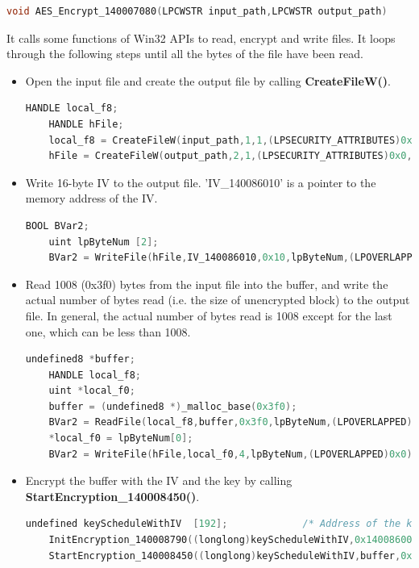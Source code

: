 \documentclass[11pt]{article}
\begin{document}
\begin{lstlisting}[language=c++]
void AES_Encrypt_140007080(LPCWSTR input_path,LPCWSTR output_path)
\end{lstlisting}

It calls some functions of Win32 APIs to read, encrypt and write files. It loops through the following steps until all the bytes of the file have been read.

\begin{itemize}
  \item Open the input file and create the output file by calling \textbf{CreateFileW()}.
  \begin{lstlisting}[language=c++]
    HANDLE local_f8;
    HANDLE hFile;
    local_f8 = CreateFileW(input_path,1,1,(LPSECURITY_ATTRIBUTES)0x0,3,0x80,(HANDLE)0x0);
    hFile = CreateFileW(output_path,2,1,(LPSECURITY_ATTRIBUTES)0x0,4,0x80(HANDLE)0x0);\end{lstlisting}
  
  \item Write 16-byte IV to the output file. 'IV\_140086010' is a pointer to the memory address of the IV.
  \begin{lstlisting}[language=c++]
    BOOL BVar2;
    uint lpByteNum [2];
    BVar2 = WriteFile(hFile,IV_140086010,0x10,lpByteNum,(LPOVERLAPPED)0x0)\end{lstlisting}

  \item Read 1008 (0x3f0) bytes from the input file into the buffer, and write the actual number of bytes read (i.e. the size of unencrypted block) to the output file. In general, the actual number of bytes read is 1008 except for the last one, which can be less than 1008.
  \begin{lstlisting}[language=c++]
    undefined8 *buffer;
    HANDLE local_f8;
    uint *local_f0;
    buffer = (undefined8 *)_malloc_base(0x3f0);
    BVar2 = ReadFile(local_f8,buffer,0x3f0,lpByteNum,(LPOVERLAPPED)0x0);
    *local_f0 = lpByteNum[0];
    BVar2 = WriteFile(hFile,local_f0,4,lpByteNum,(LPOVERLAPPED)0x0);\end{lstlisting}

  \item Encrypt the buffer with the IV and the key by calling \textbf{StartEncryption\_140008450()}.
  \begin{lstlisting}[language=c++]
    undefined keyScheduleWithIV  [192];             /* Address of the key*/
    InitEncryption_140008790((longlong)keyScheduleWithIV,0x140086000,(undefined8 *)IV_140086010);
    StartEncryption_140008450((longlong)keyScheduleWithIV,buffer,0x3f0);\end{lstlisting}


\end{itemize}
\end{document}

